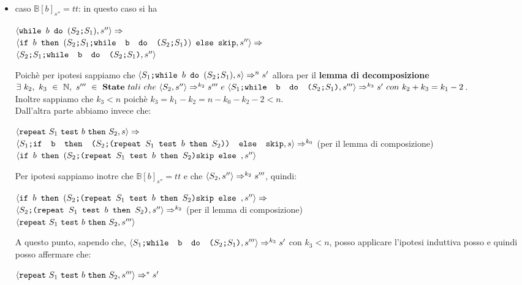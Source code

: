 {\begin{itemize}
		\item caso $\mathbb{B}[b]_{s''}=tt$: in questo caso si ha 
		\begin{center}
		$\confSs{\wbS{b}{(\concat{$S_2$}{$S_1$})}}{s''}\Rar{}$\\
		$\confSs{\ifABC{b}{(\concat{\concat{$S_2$}{$S_1$}}
		{\wbS{b}{(\concat{$S_2$}{$S_1$})}})}{\skipistr}}{s''}\Rar{}$\\
		$\confSs{\concat{\concat{$S_2$}{$S_1$}}
		{\wbS{b}{(\concat{$S_2$}{$S_1$})}}}{s''}$
		\end{center}
		Poichè per ipotesi sappiamo che $\confSs{\PDef{}}{s}\Rar{n}s'$ allora
		per il \textbf{lemma di decomposizione} \\ $\exists{}~k_2,~k_3~\in~
		\mathbb{N},~s'''~\in~\states{}~tali~che~\confSs{S_2}{s''}\Rar{k_2}s'''~e
		~\confSs{\concat{$S_1$}{\wbS{b}{(\concat{$S_2$}{$S_1$})}}}{s'''}
		\Rar{k_3}s'~con~k_2+k_3=k_1-2$.\\
		Inoltre sappiamo che $k_3<n$ poichè $k_3=k_1-k_2=n-k_0-k_2-2<n$.\\
		Dall'altra parte abbiamo invece che:
		\begin{center}
		$\confSs{\repeatSbS{S_1}{b}{S_2}}{s}\Rar{}$\\
		$\confSs{\concat{$S_1$}{\ifABC{b}{(\concat{$S_2$}
		{(\repeatSbS{$S_1$}{$b$}{$S_2$})})}{\skipistr}}}{s}\Rar{k_0}$ (per il
		lemma di composizione)\\
		$\confSs{\ifABC{b}{(\concat{$S_2$}
		{(\repeatSbS{$S_1$}{$b$}{$S_2$})}{\skipistr}}}{s''}$\\
		\end{center}
		Per ipotesi sappiamo inotre che $\mathbb{B}[b]_{s''}=tt$ e che 
		$\confSs{S_2}{s''}\Rar{k_2}s'''$, quindi:
		\begin{center}
		$\confSs{\ifABC{b}{(\concat{$S_2$}
		{(\repeatSbS{$S_1$}{$b$}{$S_2$})}{\skipistr}}}{s''}\Rar{}$\\
		$\confSs{\concat{$S_2$}{(\repeatSbS{$S_1$}{$b$}{$S_2$})}}{s''}\Rar{k_2}$
		(per il lemma di composizione)\\$\confSs{\repeatSbS{S_1}{b}{S_2}}{s'''}$
		\end{center}
		A questo punto, sapendo che,
		$\confSs{\concat{$S_1$}{\wbS{b}{(\concat{$S_2$}{$S_1$})}}}{s'''}
		\Rar{k_3}s'$ con $k_3<n$, posso applicare l'ipotesi induttiva posso e
		quindi posso affermare che:
		\begin{center}
		$\confSs{\repeatSbS{S_1}{b}{S_2}}{s'''}\Rar{*}s'$
		\end{center}
	\end{itemize}

}
